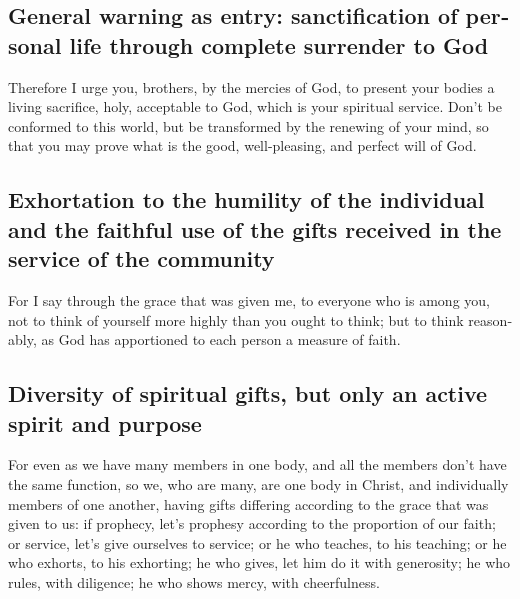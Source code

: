 \begin{paracol}{2}
\begin{otherlanguage}{english}
\hypertarget{general-warning-as-entry-sanctification-of-personal-life-through-complete-surrender-to-god}{%
\subsection{General warning as entry: sanctification of personal life
through complete surrender to
God}\label{general-warning-as-entry-sanctification-of-personal-life-through-complete-surrender-to-god}}

 Therefore I urge you, brothers, by the mercies of God, to
present your bodies a living sacrifice, holy, acceptable to God, which
is your spiritual service.  Don't be conformed to this
world, but be transformed by the renewing of your mind, so that you may
prove what is the good, well-pleasing, and perfect will of God.

\hypertarget{exhortation-to-the-humility-of-the-individual-and-the-faithful-use-of-the-gifts-received-in-the-service-of-the-community}{%
\subsection{Exhortation to the humility of the individual and the
faithful use of the gifts received in the service of the
community}\label{exhortation-to-the-humility-of-the-individual-and-the-faithful-use-of-the-gifts-received-in-the-service-of-the-community}}

 For I say through the grace that was given me, to
everyone who is among you, not to think of yourself more highly than you
ought to think; but to think reasonably, as God has apportioned to each
person a measure of faith.

\hypertarget{diversity-of-spiritual-gifts-but-only-an-active-spirit-and-purpose}{%
\subsection{Diversity of spiritual gifts, but only an active spirit and
purpose}\label{diversity-of-spiritual-gifts-but-only-an-active-spirit-and-purpose}}

 For even as we have many members in one body, and all the
members don't have the same function,  so we, who are
many, are one body in Christ, and individually members of one another,
 having gifts differing according to the grace that was
given to us: if prophecy, let's prophesy according to the proportion of
our faith;  or service, let's give ourselves to service;
or he who teaches, to his teaching;  or he who exhorts, to
his exhorting; he who gives, let him do it with generosity; he who
rules, with diligence; he who shows mercy, with cheerfulness.


\end{otherlanguage}
\end{paracol}
